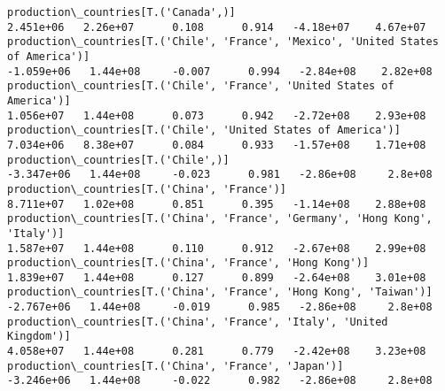 \documentclass[11pt]{article}
\begin{document}
\begin{Verbatim}[commandchars=\\\{\}]
production\_countries[T.('Canada',)]                                                                                                                                                    2.451e+06   2.26e+07      0.108      0.914   -4.18e+07    4.67e+07
production\_countries[T.('Chile', 'France', 'Mexico', 'United States of America')]                                                                                                     -1.059e+06   1.44e+08     -0.007      0.994   -2.84e+08    2.82e+08
production\_countries[T.('Chile', 'France', 'United States of America')]                                                                                                                1.056e+07   1.44e+08      0.073      0.942   -2.72e+08    2.93e+08
production\_countries[T.('Chile', 'United States of America')]                                                                                                                          7.034e+06   8.38e+07      0.084      0.933   -1.57e+08    1.71e+08
production\_countries[T.('Chile',)]                                                                                                                                                    -3.347e+06   1.44e+08     -0.023      0.981   -2.86e+08     2.8e+08
production\_countries[T.('China', 'France')]                                                                                                                                            8.711e+07   1.02e+08      0.851      0.395   -1.14e+08    2.88e+08
production\_countries[T.('China', 'France', 'Germany', 'Hong Kong', 'Italy')]                                                                                                           1.587e+07   1.44e+08      0.110      0.912   -2.67e+08    2.99e+08
production\_countries[T.('China', 'France', 'Hong Kong')]                                                                                                                               1.839e+07   1.44e+08      0.127      0.899   -2.64e+08    3.01e+08
production\_countries[T.('China', 'France', 'Hong Kong', 'Taiwan')]                                                                                                                    -2.767e+06   1.44e+08     -0.019      0.985   -2.86e+08     2.8e+08
production\_countries[T.('China', 'France', 'Italy', 'United Kingdom')]                                                                                                                 4.058e+07   1.44e+08      0.281      0.779   -2.42e+08    3.23e+08
production\_countries[T.('China', 'France', 'Japan')]                                                                                                                                  -3.246e+06   1.44e+08     -0.022      0.982   -2.86e+08     2.8e+08

\end{Verbatim}
\end{document}
